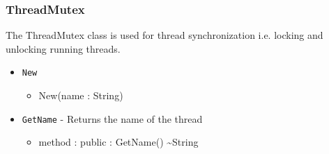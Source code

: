\documentclass[11pt]{article}
\begin{document}
\subsubsection{ThreadMutex}
The ThreadMutex class is used for thread synchronization i.e. locking
and unlocking running threads.
\begin{itemize}
\item \texttt{New}
  \begin{itemize}
  \item New(name : String)
  \end{itemize}
\item \texttt{GetName} - Returns the name of the thread
  \begin{itemize}
  \item method : public : GetName() \textasciitilde String
  \end{itemize}
\end{itemize}
\end{document}
